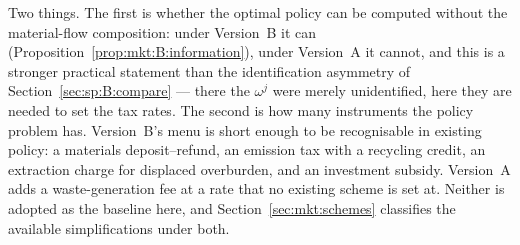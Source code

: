  Two things. The first is whether the
optimal policy can be computed without the material-flow composition: under Version~B it can
(Proposition~\ref{prop:mkt:B:information}), under Version~A it cannot, and this is a stronger practical
statement than the identification asymmetry of Section~\ref{sec:sp:B:compare} --- there the $\omega^j$
were merely unidentified, here they are needed to set the tax rates. The second is how many instruments
the policy problem has. Version~B's menu is short enough to be recognisable in existing policy:
a materials deposit--refund, an emission tax with a recycling credit, an extraction charge for
displaced overburden, and an investment subsidy. Version~A adds a waste-generation fee at a rate that
no existing scheme is set at. Neither is adopted as the baseline here, and
Section~\ref{sec:mkt:schemes} classifies the available simplifications under both.
